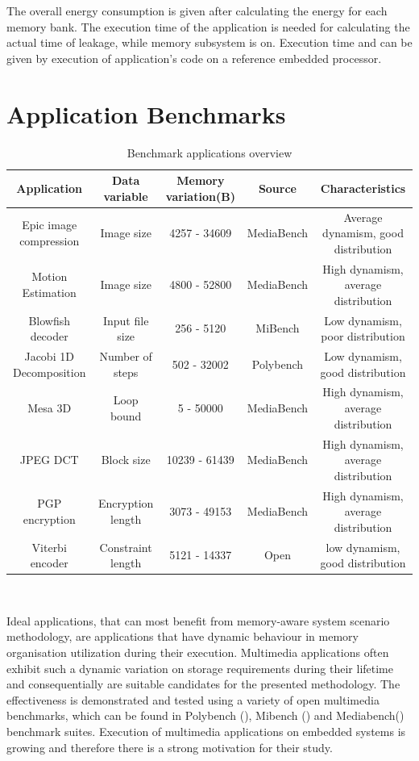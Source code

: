 \documentclass[a4paper,conference]{IEEEtran}
\begin{document}
 The overall energy consumption is given after calculating the energy for each memory bank. The execution time of the application is needed for calculating the actual time of leakage, while memory subsystem is on. Execution time and can be given by execution of application's code on a reference embedded processor.   
 
\section{Application Benchmarks}
\label{sec:applications}

\begin{center}
\begin{table}[!t]
\caption{Benchmark applications overview}
\label{tab:applications}
{\small
\hfill{}
\begin{tabular}{|c|c|c|c|c|}
\hline 
\textbf{Application} & \textbf{Data variable} & \textbf{Memory variation(B)} & \textbf{Source} & \textbf{Characteristics}\\ 
\hline 
Epic image compression & Image size & 4257 - 34609 & MediaBench & Average dynamism, good distribution\\ 
\hline 
Motion Estimation & Image size & 4800 - 52800 & MediaBench & High dynamism, average distribution\\ 
\hline 
Blowfish decoder & Input file size & 256 - 5120 & MiBench & Low dynamism, poor distribution\\ 
\hline 
Jacobi 1D Decomposition & Number of steps & 502 - 32002 & Polybench & Low dynamism, good distribution\\ 
\hline 
Mesa 3D & Loop bound & 5 - 50000 & MediaBench & High dynamism, average distribution\\ 
\hline 
JPEG DCT & Block size & 10239 - 61439 & MediaBench & High dynamism, average distribution\\ 
\hline 
PGP encryption & Encryption length & 3073 - 49153 & MediaBench & High dynamism, average distribution\\ 
\hline 
Viterbi encoder & Constraint length & 5121 - 14337 & Open & low dynamism, good distribution\\ 
\hline 
\end{tabular}}
\hfill{}
\\
\end{table}
\end{center}

Ideal applications, that can most benefit from memory-aware system scenario methodology, are applications that have dynamic behaviour in memory organisation utilization during their execution. Multimedia applications often exhibit such a dynamic variation on storage requirements during their lifetime and consequentially are suitable candidates for the presented methodology. The effectiveness is demonstrated and tested using a variety of open multimedia benchmarks, which can be found in Polybench (\cite{Poly}), Mibench (\cite{mibench}) and Mediabench(\cite{mediabench}) benchmark suites. Execution of multimedia applications on embedded systems is growing and therefore there is a strong motivation for their study.
\end{document}
